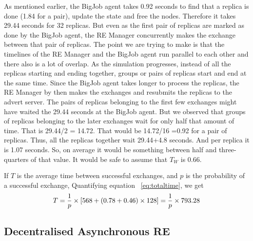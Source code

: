 \documentclass{rspublic}
\begin{document}
As mentioned earlier, the BigJob agent takes 0.92 seconds to find that a replica is done (1.84 for a pair), update the state and free the nodes. Therefore it takes 29.44 seconds for 32 replicas. But even as the first pair of replicas are marked as done by the BigJob agent, the RE Manager concurrently makes the exchange between that pair of replicas. The point we are trying to make is that the timelines of the RE Manager and the BigJob agent run parallel to each other and there also is a lot of overlap. 
As the simulation progresses, instead of all the replicas starting and ending together, groups or pairs of replicas start and end at the same time. 
Since the BigJob agent takes longer to process the replicas, the RE Manager by then makes the exchanges and resubmits the replicas to the advert server. The pairs of replicas belonging to the first few exchanges might have waited the 29.44 seconds at the BigJob agent. But we observed that groups of replicas belonging to the later exchanges wait for only half that amount of time. That is 29.44/2 = 14.72. That would be 14.72/16 =0.92 for a pair of replicas.
Thus, all the replicas together wait  29.44+4.8 seconds. And per replica it is 1.07 seconds.  So, on average it would be something between half and three-quarters of that value. It would be safe to assume that $T_W$ is 0.66. 

If $T$ is the average time between successful exchanges, and $p$ is the probability of a successful exchange, 
Quantifying equation ~\ref{eq:totaltime}, we get
\begin{eqnarray}
T=  {1 \over p} \times {[568 + (0.78 + 0.46)\times 128]} = {1 \over p} \times 793.28
\label{eq:timebt}
\end{eqnarray}


\subsection{Decentralised Asynchronous RE}
\end{document}
